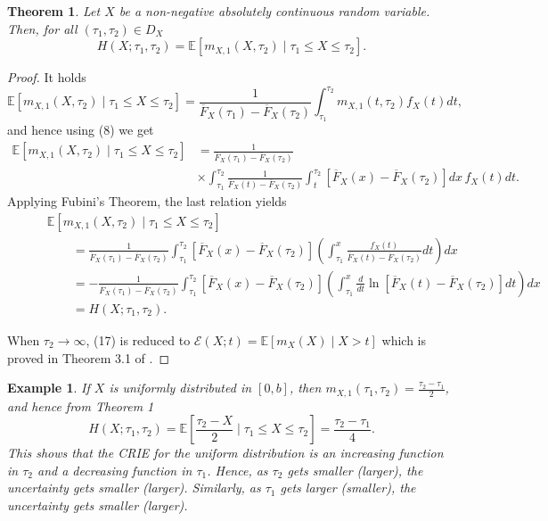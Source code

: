 \documentclass[11pt]{article}
\newtheorem{theorem}{Theorem}
\newtheorem{example}{Example}
\begin{document}
 
\begin{theorem} Let $X$ be a non-negative absolutely continuous random variable. Then, for all $(\tau_1,\tau_2) \in D_X$
	\begin{equation}
		H(X;\tau_1,\tau_2) = \mathbb{E}[m_{X,1}(X,\tau_2) \mid \tau_1 \leq X \leq \tau_2].
	\end{equation}
\end{theorem}

\begin{proof} It holds
	$$ \textstyle \mathbb{E}[m_{X,1}(X,\tau_2) \mid \tau_1 \leq X \leq \tau_2] = \frac{1}{\overline{F}_X(\tau_1) - \overline{F}_X(\tau_2)} \int_{\tau_1}^{\tau_2} m_{X,1}(t,\tau_2) f_X(t) dt, $$
	and hence using (8) we get
	\begin{align*}
		\mathbb{E}[m_{X,1}(X,\tau_2) \mid \tau_1 \leq X \leq \tau_2] & \textstyle = \frac{1}{\overline{F}_X(\tau_1) - \overline{F}_X(\tau_2)} \\
		& \textstyle \times \int_{\tau_1}^{\tau_2} \frac{1}{\overline{F}_X(t)-\overline{F}_X(\tau_2)} \int_t^{\tau_2} [\overline{F}_X(x)-\overline{F}_X(\tau_2)] dx \, f_X(t) dt.
	\end{align*} 
	Applying Fubini’s Theorem, the last relation yields
	{\small \begin{align*}
			& \textstyle \qquad \mathbb{E}[m_{X,1}(X,\tau_2) \mid \tau_1 \leq X \leq \tau_2] \\
			& \textstyle \qquad \qquad = \frac{1}{\overline{F}_X(\tau_1) - \overline{F}_X(\tau_2)} \int_{\tau_1}^{\tau_2} [\overline{F}_X(x)-\overline{F}_X(\tau_2)] \left( \int_{\tau_1}^x \frac{f_X(t)}{\overline{F}_X(t)-\overline{F}_X(\tau_2)} dt \right) dx \\
			& \textstyle \qquad \qquad = - \frac{1}{\overline{F}_X(\tau_1) - \overline{F}_X(\tau_2)} \int_{\tau_1}^{\tau_2} [\overline{F}_X(x)-\overline{F}_X(\tau_2)] \left( \int_{\tau_1}^x \frac{d}{dt} \ln[\overline{F}_X(t)-\overline{F}_X(\tau_2)] dt \right) dx \\
			& \textstyle \qquad \qquad = H(X;\tau_1,\tau_2).
	\end{align*}}
	
	When $\tau_2 \to \infty$, (17) is reduced to $\mathcal{E}(X;t)=\mathbb{E}[m_X(X) \mid X > t]$ which is proved in Theorem 3.1 of \cite{Asadi2007}.
\end{proof}

 
\begin{example} If $X$ is uniformly distributed in $[0,b]$, then $m_{X,1}(\tau_1,\tau_2) = \frac{\tau_2 - \tau_1}{2}$, and hence from Theorem 1 $$ \textstyle H(X;\tau_1,\tau_2) = \mathbb{E} \left[ \frac{\tau_2 - X}{2} \mid \tau_1 \leq X \leq \tau_2 \right] = \frac{\tau_2 - \tau_1}{4}. $$
	This shows that the CRIE for the uniform distribution is an increasing function in $\tau_2$ and a decreasing function in $\tau_1$. Hence, as $\tau_2$ gets smaller (larger), the uncertainty gets smaller (larger). Similarly, as $\tau_1$ gets larger (smaller), the uncertainty gets smaller (larger).
\end{example}
\end{document}
